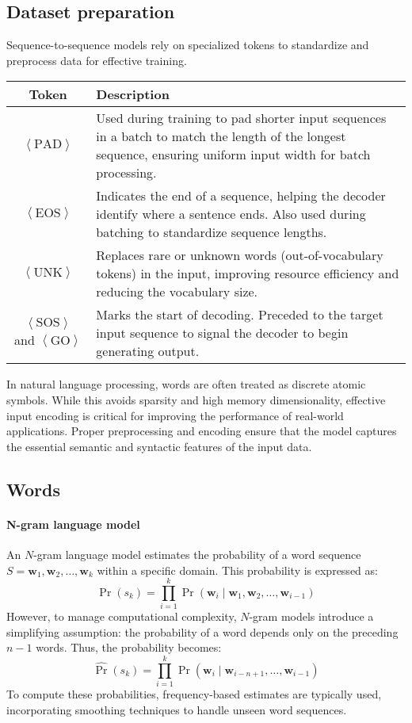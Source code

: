 \subsection{Dataset preparation}
Sequence-to-sequence models rely on specialized tokens to standardize and preprocess data for effective training. 
\begin{table}[H]
    \centering
    \begin{tabular}{|c|p{10cm}|}
    \hline
    \textbf{Token} & \textbf{Description} \\ \hline
    $\left\langle \text{PAD}\right\rangle $ & Used during training to pad shorter input sequences in a batch to match the length of the longest sequence, ensuring uniform input width for batch processing. \\ \hline
    $\left\langle \text{EOS}\right\rangle $ & Indicates the end of a sequence, helping the decoder identify where a sentence ends. Also used during batching to standardize sequence lengths. \\ \hline
    $\left\langle \text{UNK}\right\rangle $ & Replaces rare or unknown words (out-of-vocabulary tokens) in the input, improving resource efficiency and reducing the vocabulary size. \\ \hline
    $\left\langle \text{SOS}\right\rangle $ and $\left\langle \text{GO}\right\rangle$ & Marks the start of decoding. Preceded to the target input sequence to signal the decoder to begin generating output. \\ \hline
    \end{tabular}
\end{table}
In natural language processing, words are often treated as discrete atomic symbols. 
While this avoids sparsity and high memory dimensionality, effective input encoding is critical for improving the performance of real-world applications. 
Proper preprocessing and encoding ensure that the model captures the essential semantic and syntactic features of the input data.

\subsection{Words}
\paragraph*{N-gram language model}
An $N$-gram language model estimates the probability of a word sequence $S = \mathbf{w}_1, \mathbf{w}_2, \ldots, \mathbf{w}_k$ within a specific domain.
This probability is expressed as:
\[\Pr(s_k) = \prod_{i=1}^{k} \Pr(\mathbf{w}_i \mid \mathbf{w}_1, \mathbf{w}_2, \ldots, \mathbf{w}_{i-1})\]
However, to manage computational complexity, $N$-gram models introduce a simplifying assumption: the probability of a word depends only on the preceding $n-1$ words. 
Thus, the probability becomes:
\[\hat{\Pr}(s_k) = \prod_{i=1}^{k} \Pr(\mathbf{w}_i \mid \mathbf{w}_{i-n+1}, \ldots, \mathbf{w}_{i-1})\]
To compute these probabilities, frequency-based estimates are typically used, incorporating smoothing techniques to handle unseen word sequences. 

